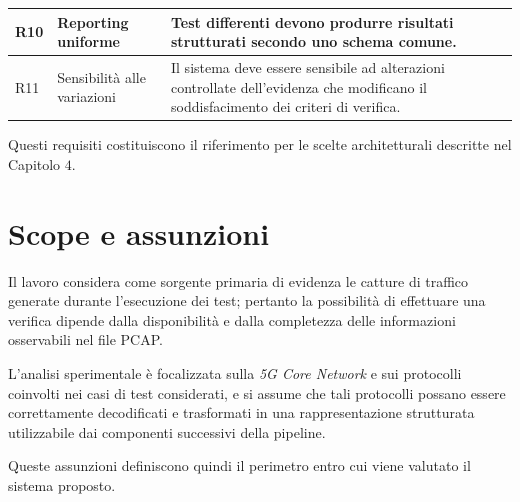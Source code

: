 \begin{center}
\begin{minipage}{\textwidth}
\begin{tabularx}{\textwidth}{|
    >{\centering\arraybackslash}p{}|
    >{\raggedright\arraybackslash}p{}|
    >{\raggedright\arraybackslash}X|}
R10 & Reporting uniforme &
Test differenti devono produrre risultati strutturati secondo uno schema comune. \\
\hline

R11 & Sensibilità alle variazioni &
Il sistema deve essere sensibile ad alterazioni controllate dell'evidenza che modificano il soddisfacimento dei criteri di verifica. \\
\hline

\end{tabularx}
\endgroup
{}
\label{tab:requisiti-sistema}
\end{minipage}
\end{center}


Questi requisiti costituiscono il riferimento per le scelte architetturali descritte nel Capitolo \(4\).


\section{Scope e assunzioni}\label{scope-e-assunzioni}

Il lavoro considera come sorgente primaria di evidenza le catture di traffico generate durante l'esecuzione dei test; pertanto la possibilità di effettuare una verifica dipende dalla disponibilità e dalla completezza delle informazioni osservabili nel file PCAP.

L'analisi sperimentale è focalizzata sulla \emph{5G Core Network} e sui protocolli coinvolti nei casi di test considerati, e si assume che tali protocolli possano essere correttamente decodificati e trasformati in una rappresentazione strutturata utilizzabile dai componenti successivi della pipeline.

Queste assunzioni definiscono quindi il perimetro entro cui viene valutato il sistema proposto.
